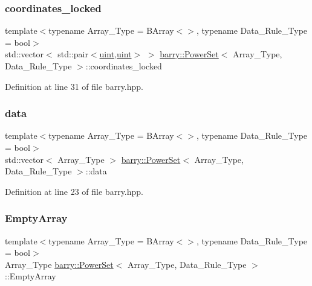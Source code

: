 \subsubsection{\texorpdfstring{coordinates\+\_\+locked}{coordinates\_locked}}
{\footnotesize\ttfamily template$<$typename Array\+\_\+\+Type  = B\+Array$<$$>$, typename Data\+\_\+\+Rule\+\_\+\+Type  = bool$>$ \\
std\+::vector$<$ std\+::pair$<$\hyperlink{namespacebarry_a11dfc53ddb4672278319aa04f1e09a6c}{uint},\hyperlink{namespacebarry_a11dfc53ddb4672278319aa04f1e09a6c}{uint}$>$ $>$ \hyperlink{classbarry_1_1_power_set}{barry\+::\+Power\+Set}$<$ Array\+\_\+\+Type, Data\+\_\+\+Rule\+\_\+\+Type $>$\+::coordinates\+\_\+locked}



Definition at line 31 of file barry.\+hpp.

\mbox{\label{classbarry_1_1_power_set_a90fecd17a9d1f36153c07bc929b1630f}} 
\subsubsection{\texorpdfstring{data}{data}}
{\footnotesize\ttfamily template$<$typename Array\+\_\+\+Type  = B\+Array$<$$>$, typename Data\+\_\+\+Rule\+\_\+\+Type  = bool$>$ \\
std\+::vector$<$ Array\+\_\+\+Type $>$ \hyperlink{classbarry_1_1_power_set}{barry\+::\+Power\+Set}$<$ Array\+\_\+\+Type, Data\+\_\+\+Rule\+\_\+\+Type $>$\+::data}



Definition at line 23 of file barry.\+hpp.

\mbox{\label{classbarry_1_1_power_set_a7709618ce9c3d9346499c7b23b91392a}} 
\subsubsection{\texorpdfstring{Empty\+Array}{EmptyArray}}
{\footnotesize\ttfamily template$<$typename Array\+\_\+\+Type  = B\+Array$<$$>$, typename Data\+\_\+\+Rule\+\_\+\+Type  = bool$>$ \\
Array\+\_\+\+Type \hyperlink{classbarry_1_1_power_set}{barry\+::\+Power\+Set}$<$ Array\+\_\+\+Type, Data\+\_\+\+Rule\+\_\+\+Type $>$\+::Empty\+Array}



